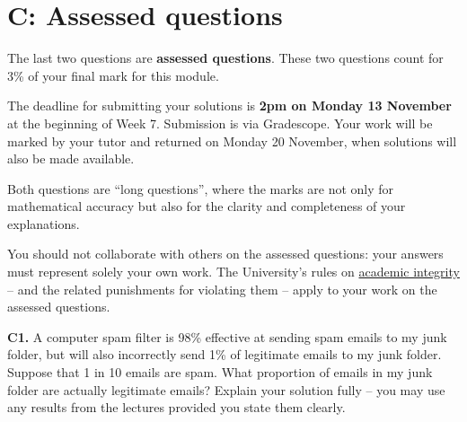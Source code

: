 \documentclass[
  a4paper,
]{book}
\theoremstyle{definition}
\theoremstyle{definition}
\theoremstyle{definition}
\theoremstyle{definition}
\theoremstyle{remark}
\begin{document}
\hypertarget{P3-assessed}{%
\section*{C: Assessed questions}\label{P3-assessed}}

The last two questions are \textbf{assessed questions}. These two questions count for 3\% of your final mark for this module.

The deadline for submitting your solutions is \textbf{2pm on Monday 13 November} at the beginning of Week 7. Submission is via Gradescope.
Your work will be marked by your tutor and returned on Monday 20 November, when solutions will also be made available.

Both questions are ``long questions'', where the marks are not only for mathematical accuracy but also for the clarity and completeness of your explanations.

You should not collaborate with others on the assessed questions: your answers must represent solely your own work. The University's rules on \href{https://library.leeds.ac.uk/info/1401/academic_skills/46/academic_integrity_and_plagiarism}{academic integrity} -- and the related punishments for violating them -- apply to your work on the assessed questions.

\textbf{C1.} A computer spam filter is 98\% effective at sending spam emails to my junk folder, but will also incorrectly send 1\% of legitimate emails to my junk folder. Suppose that 1 in 10 emails are spam. What proportion of emails in my junk folder are actually legitimate emails? Explain your solution fully -- you may use any results from the lectures provided you state them clearly.
\end{document}
